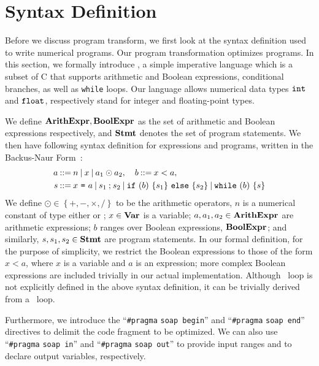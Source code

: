 \section{Syntax Definition}
\label{po:sec:syntax_definition}

Before we discuss program transform, we first look at the syntax definition
used to write numerical programs.  Our program transformation optimizes
\numimp{} programs.  In this section, we formally introduce \numimp, a simple
imperative language which is a subset of C that supports arithmetic and Boolean
expressions, conditional branches, as well as \texttt{while} loops.  Our
language allows numerical data types $\texttt{int}$ and $\texttt{float}$, respectively
stand for integer and floating-point types.

We define $\mathbf{ArithExpr}, \mathbf{BoolExpr}$ as the set of arithmetic and Boolean
expressions respectively, and $\mathbf{Stmt}$ denotes the set of program statements.
We then have following syntax definition for expressions and \numimp{}
programs, written in the Backus-Naur Form~\cite{knuth64}:
\newcommand{\syndef}{\ensuremath\mathbin{::=}}%
\newcommand{\synor}{\ensuremath\mathbin{\mid}}%
\begin{equation}
    \begin{aligned}
        a \syndef {} &
            n \synor
            x \synor
            a_1 \odot a_2,
        \quad b \syndef x < a, \\
        s \syndef {} &
            x~\texttt{=}~a \synor
            s_1 \semicolon s_2 \synor
            \mathtt{if}~(b)~\{ s_1 \}~\mathtt{else}~\{ s_2 \} \synor
            \whilelit~(b)~\{s\}
    \end{aligned}
    \label{po:eq:program_syntax}
\end{equation}
We define $\odot \in \left\{ +, -, \times, / \right\}$ to be the arithmetic
operators, $n$ is a numerical constant of type either \inttype{} or \floattype;
$x \in \mathbf{Var}$ is a variable; $a, a_1, a_2 \in \mathbf{ArithExpr}$ are arithmetic
expressions; $b$ ranges over Boolean expressions, $\mathbf{BoolExpr}$; and similarly,
$s, s_1, s_2 \in \mathbf{Stmt}$ are program statements.  In our formal definition,
for the purpose of simplicity, we restrict the Boolean expressions to those
of the form $x < a$, where $x$ is a variable and $a$ is an expression;
more complex Boolean expressions are included trivially in our actual
implementation.  Although \forlit~loop is not explicitly defined in the above
syntax definition, it can be trivially derived from a \whilelit~loop.

Furthermore, we introduce the ``\verb|#pragma| \verb|soap begin|'' and
``\verb|#pragma| \verb|soap end|'' directives to delimit the code fragment
to be optimized.  We can also use ``\verb|#pragma| \verb|soap in|'' and
``\verb|#pragma| \verb|soap out|'' to provide input ranges and to declare
output variables, respectively.

